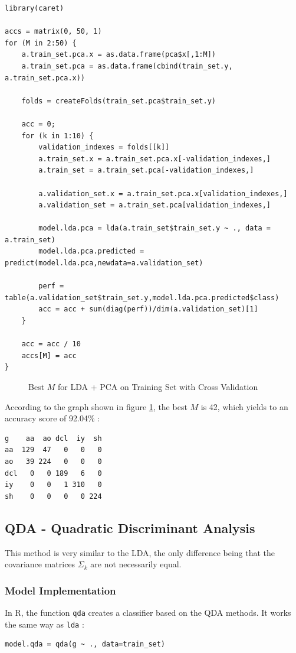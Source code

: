 \documentclass[]{report}
\newcommand{\inputtikz}[2]{%
	\scalebox{#1}{}  
}
\begin{document}
\begin{lstlisting}
library(caret)

accs = matrix(0, 50, 1)
for (M in 2:50) {
	a.train_set.pca.x = as.data.frame(pca$x[,1:M])
	a.train_set.pca = as.data.frame(cbind(train_set.y, a.train_set.pca.x))
	
	folds = createFolds(train_set.pca$train_set.y)
	
	acc = 0;
	for (k in 1:10) {
		validation_indexes = folds[[k]]
		a.train_set.x = a.train_set.pca.x[-validation_indexes,]
		a.train_set = a.train_set.pca[-validation_indexes,]
		
		a.validation_set.x = a.train_set.pca.x[validation_indexes,]
		a.validation_set = a.train_set.pca[validation_indexes,]
		
		model.lda.pca = lda(a.train_set$train_set.y ~ ., data = a.train_set)
		model.lda.pca.predicted = predict(model.lda.pca,newdata=a.validation_set)
		
		perf = table(a.validation_set$train_set.y,model.lda.pca.predicted$class)
		acc = acc + sum(diag(perf))/dim(a.validation_set)[1]
	}

	acc = acc / 10
	accs[M] = acc
}
\end{lstlisting}

\begin{figure}[!hb]
	\centering
	\inputtikz{0.5}{Figures/lda_pca_cv.tex}
	\caption{Best $M$ for LDA + PCA on Training Set with Cross Validation}
	\label{fig:lda_pca_cv}
\end{figure}

According to the graph shown in figure \ref{fig:lda_pca_cv}, the best $M$ is 42, which yields to an accuracy score of 92.04\% :
\begin{verbatim}
g    aa  ao dcl  iy  sh
aa  129  47   0   0   0
ao   39 224   0   0   0
dcl   0   0 189   6   0
iy    0   0   1 310   0
sh    0   0   0   0 224
\end{verbatim}

\subsection{QDA - Quadratic Discriminant Analysis}
This method is very similar to the LDA, the only difference being that the covariance matrices $\Sigma_k$ are not necessarily equal.

\subsubsection{Model Implementation}
In R, the function \texttt{qda} creates a classifier based on the QDA methods. It works the same way as \texttt{lda} :
\begin{lstlisting}
model.qda = qda(g ~ ., data=train_set)
\end{lstlisting}
\end{document}
